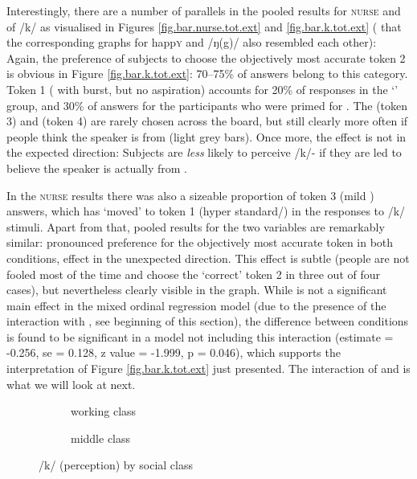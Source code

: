 Interestingly, there are a number of parallels in the pooled results for \textsc{nurse} and  of /k/ as visualised in Figures \ref{fig.bar.nurse.tot.ext} and \ref{fig.bar.k.tot.ext} ( that the corresponding graphs for happ\textsc{y} and /ŋ(g)/ also resembled each other):
Again, the preference of subjects to choose the objectively most accurate token 2 is obvious in Figure \ref{fig.bar.k.tot.ext}: 70--75\% of answers belong to this category.
Token 1 ( with burst, but no aspiration) accounts for 20\% of responses in the `' group, and 30\% of answers for the participants who were primed for .
The  (token 3) and  (token 4) are rarely chosen across the board, but still clearly more often if people think the speaker is from  (light grey bars).
Once more, the  effect is not in the expected direction: Subjects are \emph{less} likely to perceive /k/- if they are led to believe the speaker is actually from .

In the \textsc{nurse} results there was also a sizeable proportion of token 3 (mild ) answers, which has `moved' to token 1 (hyper standard/) in the responses to /k/ stimuli.
Apart from that, pooled results for the two  variables are remarkably similar: pronounced preference for the objectively most accurate token in both conditions,  effect in the unexpected direction.
This  effect is subtle (people are not fooled most of the time and choose the `correct' token 2 in three out of four cases), but nevertheless clearly visible in the graph.
While  is not a significant main effect in the mixed ordinal regression model (due to the presence of the interaction with , see beginning of this section), the difference between conditions is found to be significant in a model not including this interaction (estimate = -0.256, se = 0.128, z value = -1.999, p = 0.046), which supports the interpretation of Figure \ref{fig.bar.k.tot.ext} just presented.
The interaction of  and  is what we will look at next.

\begin{figure}[h]
	\centering
	\begin{subfigure}{0.49\textwidth}
		\centering
			\resizebox{\linewidth}{!}{} 
		\caption{working class}
		\label{fig.bar.k.ext.wc}
	\end{subfigure}
	\begin{subfigure}{0.49\textwidth}
		\centering
			\resizebox{\linewidth}{!}{} 
		\caption{middle class}
		\label{fig.bar.k.ext.mc}
	\end{subfigure}
	\caption{/k/ (perception) by social class}
	\label{fig.bar.k.ext.class}
\end{figure}

